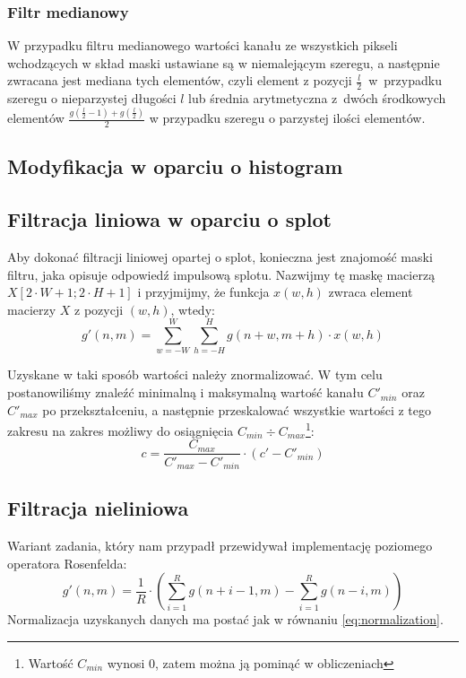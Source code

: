 \documentclass{classrep}
\begin{document}
\subsubsection{Filtr medianowy}
\label{filter.median}
W przypadku filtru medianowego wartości kanału ze wszystkich pikseli wchodzących w skład maski ustawiane są w niemalejącym szeregu, a następnie zwracana jest mediana tych elementów, czyli element z pozycji $\frac{l}{2}$~w~przypadku szeregu o nieparzystej długości $l$ lub średnia arytmetyczna z~dwóch środkowych elementów $\frac{g(\frac{l}{2} - 1) + g(\frac{l}{2})}{2}$ w przypadku szeregu o parzystej ilości elementów.

\subsection{Modyfikacja w oparciu o histogram}

\subsection{Filtracja liniowa w oparciu o splot}
\label{filter.convolution}
Aby dokonać filtracji liniowej opartej o splot, konieczna jest znajomość maski filtru, jaka opisuje odpowiedź impulsową splotu. Nazwijmy tę maskę macierzą $X[2 \cdot W + 1; 2 \cdot H + 1]$ i przyjmijmy, że funkcja $x(w, h)$ zwraca element macierzy $X$ z pozycji $(w, h)$, wtedy:
\begin{equation}
 g'(n, m) = \displaystyle \sum \limits_{w=-W}^W \displaystyle \sum \limits_{h=-H}^H g(n + w, m + h) \cdot x(w, h)
\end{equation}

Uzyskane w taki sposób wartości należy znormalizować. W tym celu postanowiliśmy znaleźć minimalną i maksymalną wartość kanału $C'_{min}$ oraz $C'_{max}$ po przekształceniu, a następnie przeskalować wszystkie wartości z tego zakresu na zakres możliwy do osiągnięcia $C_{min} \div C_{max}$\footnote{Wartość $C_{min}$ wynosi 0, zatem można ją pominąć w obliczeniach}:
\begin{equation}
 \label{eq:normalization}
 c = \frac{C_{max}}{C'_{max} - C'_{min}} \cdot (c' - C'_{min})
\end{equation}

\subsection{Filtracja nieliniowa}
\label{filter.nonlinear}
Wariant zadania, który nam przypadł przewidywał implementację poziomego operatora Rosenfelda:
\begin{equation}
 g'(n, m) = \frac{1}{R} \cdot \left( \displaystyle \sum \limits_{i=1}^R g\left(n + i - 1, m\right) - \displaystyle \sum \limits_{i=1}^R g\left(n - i, m\right) \right)
\end{equation}
Normalizacja uzyskanych danych ma postać jak w równaniu \ref{eq:normalization}.
\end{document}
